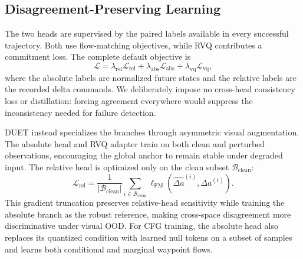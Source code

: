 \documentclass[letterpaper, 10 pt, conference]{ieeeconf}
\begin{document}
\subsection{Disagreement-Preserving Learning}
The two heads are supervised by the paired labels available in every successful trajectory. Both use flow-matching objectives, while RVQ contributes a commitment loss. The complete default objective is
\begin{equation}
    \mathcal{L} =
    \lambda_{\mathrm{rel}}\mathcal{L}_{\mathrm{rel}}
    + \lambda_{\mathrm{abs}}\mathcal{L}_{\mathrm{abs}}
    + \lambda_{\mathrm{vq}}\mathcal{L}_{\mathrm{vq}},
\label{eq:training_loss}
\end{equation}
where the absolute labels are normalized future states and the relative labels are the recorded delta commands. We deliberately impose no cross-head consistency loss or distillation: forcing agreement everywhere would suppress the inconsistency needed for failure detection.

DUET instead specializes the branches through asymmetric visual augmentation. The absolute head and RVQ adapter train on both clean and perturbed observations, encouraging the global anchor to remain stable under degraded input. The relative head is optimized only on the clean subset $\mathcal{B}_{\mathrm{clean}}$:
\begin{equation}
    \mathcal{L}_{\mathrm{rel}} =
    \frac{1}{|\mathcal{B}_{\mathrm{clean}}|}
    \sum_{i \in \mathcal{B}_{\mathrm{clean}}}
    \ell_{\mathrm{FM}}(\hat{\Delta a}^{(i)}, \Delta a^{(i)}).
\end{equation}
This gradient truncation preserves relative-head sensitivity while training the absolute branch as the robust reference, making cross-space disagreement more discriminative under visual OOD. For CFG training, the absolute head also replaces its quantized condition with learned null tokens on a subset of samples and learns both conditional and marginal waypoint flows.
\end{document}
